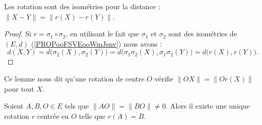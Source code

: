 \begin{lemma}       \label{LEMooTZNWooTVOklu}
	Les rotation sont des isométries pour la distance : \( \| X-Y \|=\| r(X)-r(Y) \|\).
\end{lemma}

\begin{proof}
	Si \( r=\sigma_1\circ\sigma_2\), en utilisant le fait que \( \sigma_1\) et \( \sigma_2\) sont des isométries de \( (E,d)\) (\ref{PROPooFSVEooWmJsnv}) nous avons :
	\begin{equation}
		d(X,Y)=d\big( \sigma_2(X),\sigma_2(Y) \big)=d\big( \sigma_1\sigma_2(X),\sigma_1\sigma_2(Y) \big)=d\big( r(X),r(Y) \big).
	\end{equation}
\end{proof}

Ce lemme nous dit qu'une rotation de centre \( O\) vérifie \( \| OX \|=\| Or(X) \|\) pour tout \( X\).

\begin{proposition}      \label{PROPooNXJKooEDOczh}
	Soient \( A,B,O\in E\) tels que \( \| AO \|=\| BO \|\neq 0\). Alors il existe une unique rotation \( r\) centrée en \( O\) telle que \( r(A)=B\).
\end{proposition}



